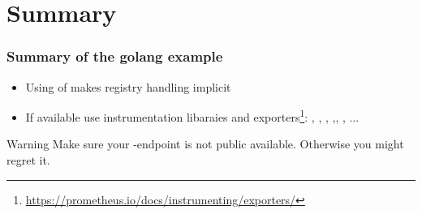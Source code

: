 \section{Summary}
\begin{frame}
  \frametitle{Summary of the golang example} 
 
    \begin{itemize}
     \item Using of  makes registry handling implicit 
     \item If available use instrumentation libaraies and exporters\footnote{\url{https://prometheus.io/docs/instrumenting/exporters/}}: , , , ,, , ...
    \end{itemize}

 
   \begin{block}{Warning}
   Make sure your -endpoint is not public available. Otherwise you might regret it.
  \end{block}
  

\end{frame}
